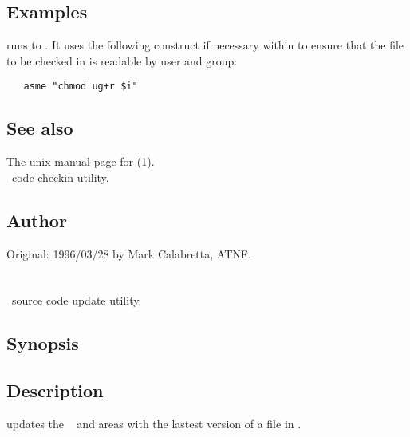 \subsection*{Examples}
 
 runs  to .  It uses the following
construct if necessary within to ensure that the file to be checked in is
readable by user and group:

\begin{verbatim}
   asme "chmod ug+r $i"
\end{verbatim}
 
 
\subsection*{See also}
 
The unix manual page for (1).\\
 \aipspp\ code checkin utility.\\
 
\subsection*{Author}
 
Original: 1996/03/28 by Mark Calabretta, ATNF.


\newpage
\section{}
\label{au}

\aipspp\ source code update utility.

\subsection*{Synopsis}

\begin{synopsis}
\end{synopsis}

\subsection*{Description}

 updates the \aipspp\  and  areas with the
lastest version of a file in .

